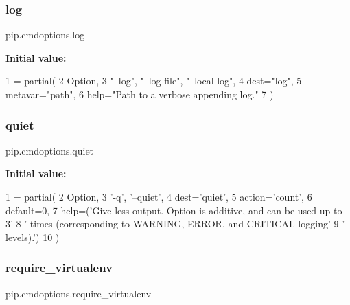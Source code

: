 \subsubsection{\texorpdfstring{log}{log}}
{\footnotesize\ttfamily pip.\+cmdoptions.\+log}

{\bfseries Initial value\+:}
\begin{DoxyCode}
1 =  partial(
2     Option,
3     \textcolor{stringliteral}{"--log"}, \textcolor{stringliteral}{"--log-file"}, \textcolor{stringliteral}{"--local-log"},
4     dest=\textcolor{stringliteral}{"log"},
5     metavar=\textcolor{stringliteral}{"path"},
6     help=\textcolor{stringliteral}{"Path to a verbose appending log."}
7 )
\end{DoxyCode}
\mbox{\label{namespacepip_1_1cmdoptions_a73fbc99c76e32b52230a2614565b79f7}} 
\subsubsection{\texorpdfstring{quiet}{quiet}}
{\footnotesize\ttfamily pip.\+cmdoptions.\+quiet}

{\bfseries Initial value\+:}
\begin{DoxyCode}
1 =  partial(
2     Option,
3     \textcolor{stringliteral}{'-q'}, \textcolor{stringliteral}{'--quiet'},
4     dest=\textcolor{stringliteral}{'quiet'},
5     action=\textcolor{stringliteral}{'count'},
6     default=0,
7     help=(\textcolor{stringliteral}{'Give less output. Option is additive, and can be used up to 3'}
8           \textcolor{stringliteral}{' times (corresponding to WARNING, ERROR, and CRITICAL logging'}
9           \textcolor{stringliteral}{' levels).'})
10 )
\end{DoxyCode}
\mbox{\label{namespacepip_1_1cmdoptions_aa7e739a12d818b9aaa9f3771b05cba0c}} 
\subsubsection{\texorpdfstring{require\+\_\+virtualenv}{require\_virtualenv}}
{\footnotesize\ttfamily pip.\+cmdoptions.\+require\+\_\+virtualenv}

